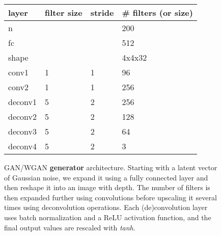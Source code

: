 \documentclass[twoside,11pt,a4paper]{article}
\newcommand{\drawcnnlayer}[7]{
  \path (0,0);
  \begin{scope}[shift={#1}]
  \draw[black,fill=#5] (0,0,0) -- ++(-#2,0,0) -- ++(0,-#3,0) -- ++(#2,0,0) -- cycle;
  \draw[black,fill=#5] (0,0,0) -- ++(0,0,-#4) -- ++(0,-#3,0) -- ++(0,0,#4) -- cycle;
  \draw[black,fill=#5] (0,0,0) -- ++(-#2,0,0) -- ++(0,0,-#4) -- ++(#2,0,0) -- cycle;
  \end{scope}
  }
\begin{document}
\begin{figure}
  \begin{center}

    \vspace{1em}


    \begin{tabular}{l||l|l|l}
      layer & filter size & stride & \# filters (or size) \\
      \hline
      n & & & 200 \\
      fc & & & 512 \\
      shape & & & 4x4x32 \\
      \hline
      conv1 & 1 & 1 & 96 \\
      conv2 & 1 & 1 & 256 \\
      \hline
      deconv1 & 5 & 2 & 256 \\
      deconv2 & 5 & 2 & 128 \\
      deconv3 & 5 & 2 & 64 \\            
      deconv4 & 5 & 2 & 3 \\     
      
    \end{tabular}

    
  \end{center}
  \caption{GAN/WGAN \textbf{generator} architecture. Starting with a latent vector of Gaussian noise, we expand it using a fully connected layer and then reshape it into an image with depth. The number of filters is then expanded further using convolutions before upscaling it several times using deconvolution operations. Each (de)convolution layer uses batch normalization and a ReLU activation function, and the final output values are rescaled with \emph{tanh}.}
\end{figure}
\end{document}
